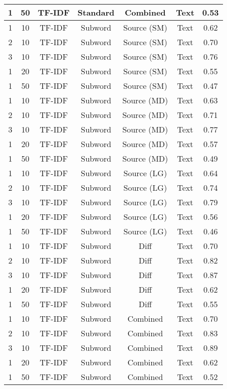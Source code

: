 \begin{longtable}{|c|c|c|c|c|c|c|}
\hline
1 & 50 & TF-IDF & Standard & Combined & Text & 0.53 \\
\hline
1 & 10 & TF-IDF & Subword & Source (SM) & Text & 0.62 \\
\hline
2 & 10 & TF-IDF & Subword & Source (SM) & Text & 0.70 \\
\hline
3 & 10 & TF-IDF & Subword & Source (SM) & Text & 0.76 \\
\hline
1 & 20 & TF-IDF & Subword & Source (SM) & Text & 0.55 \\
\hline
1 & 50 & TF-IDF & Subword & Source (SM) & Text & 0.47 \\
\hline
1 & 10 & TF-IDF & Subword & Source (MD) & Text & 0.63 \\
\hline
2 & 10 & TF-IDF & Subword & Source (MD) & Text & 0.71 \\
\hline
3 & 10 & TF-IDF & Subword & Source (MD) & Text & 0.77 \\
\hline
1 & 20 & TF-IDF & Subword & Source (MD) & Text & 0.57 \\
\hline
1 & 50 & TF-IDF & Subword & Source (MD) & Text & 0.49 \\
\hline
1 & 10 & TF-IDF & Subword & Source (LG) & Text & 0.64 \\
\hline
2 & 10 & TF-IDF & Subword & Source (LG) & Text & 0.74 \\
\hline
3 & 10 & TF-IDF & Subword & Source (LG) & Text & 0.79 \\
\hline
1 & 20 & TF-IDF & Subword & Source (LG) & Text & 0.56 \\
\hline
1 & 50 & TF-IDF & Subword & Source (LG) & Text & 0.46 \\
\hline
1 & 10 & TF-IDF & Subword & Diff & Text & 0.70 \\
\hline
2 & 10 & TF-IDF & Subword & Diff & Text & 0.82 \\
\hline
3 & 10 & TF-IDF & Subword & Diff & Text & 0.87 \\
\hline
1 & 20 & TF-IDF & Subword & Diff & Text & 0.62 \\
\hline
1 & 50 & TF-IDF & Subword & Diff & Text & 0.55 \\
\hline
1 & 10 & TF-IDF & Subword & Combined & Text & 0.70 \\
\hline
2 & 10 & TF-IDF & Subword & Combined & Text & 0.83 \\
\hline
3 & 10 & TF-IDF & Subword & Combined & Text & 0.89 \\
\hline
1 & 20 & TF-IDF & Subword & Combined & Text & 0.62 \\
\hline
1 & 50 & TF-IDF & Subword & Combined & Text & 0.52 \\

\end{longtable}

